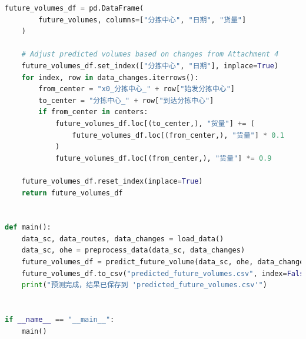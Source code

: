 \documentclass[UTF8]{article}%
\begin{document}
\begin{lstlisting}[language=python]
    future_volumes_df = pd.DataFrame(
        future_volumes, columns=["分拣中心", "日期", "货量"]
    )

    # Adjust predicted volumes based on changes from Attachment 4
    future_volumes_df.set_index(["分拣中心", "日期"], inplace=True)
    for index, row in data_changes.iterrows():
        from_center = "x0_分拣中心_" + row["始发分拣中心"]
        to_center = "分拣中心_" + row["到达分拣中心"]
        if from_center in centers:
            future_volumes_df.loc[(to_center,), "货量"] += (
                future_volumes_df.loc[(from_center,), "货量"] * 0.1
            )
            future_volumes_df.loc[(from_center,), "货量"] *= 0.9

    future_volumes_df.reset_index(inplace=True)
    return future_volumes_df


def main():
    data_sc, data_routes, data_changes = load_data()
    data_sc, ohe = preprocess_data(data_sc, data_changes)
    future_volumes_df = predict_future_volume(data_sc, ohe, data_changes)
    future_volumes_df.to_csv("predicted_future_volumes.csv", index=False)
    print("预测完成，结果已保存到 'predicted_future_volumes.csv'")


if __name__ == "__main__":
    main()
\end{lstlisting}
\end{document}

